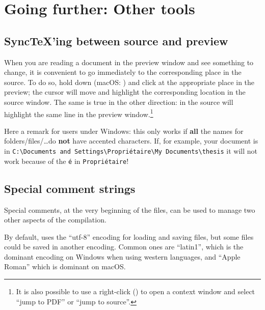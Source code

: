 
\chapter{Going further: Other tools}

\section{SyncTeX'ing between source and preview}
\label{sec.synctex}

When you are reading a document in the preview window and see something to change, it is convenient to go immediately to the corresponding place in the source. To do so, hold down  (macOS: ) and click at the appropriate place in the preview; the cursor will move and highlight the corresponding location in the source window. The same is true in the other direction:  in the source will highlight the same line in the preview window.\footnote{It is also possible to use a right-click () to open a context window and select ``jump to PDF'' or ``jump to source''.}

\begin{OSWindows}
Here a remark for users under Windows: this only works if \textbf{all} the names for folders/files/\dots do \textbf{not} have accented characters. If, for example, your document is in \texttt{C:{\textbackslash}Documents and Settings{\textbackslash}Propriétaire{\textbackslash}My Documents{\textbackslash}thesis} it will not work because of the \verb|é| in \texttt{Propriétaire}!
\end{OSWindows}

\section{Special comment strings}

Special comments, at the very beginning of the files, can be used to manage two other aspects of the compilation.

By default, {\Tw} uses the ``utf-8'' encoding for loading and saving files, but some files could be saved in another encoding. Common ones are ``latin1'', which is the dominant encoding on Windows when using western languages, and ``Apple Roman'' which is dominant on macOS.

